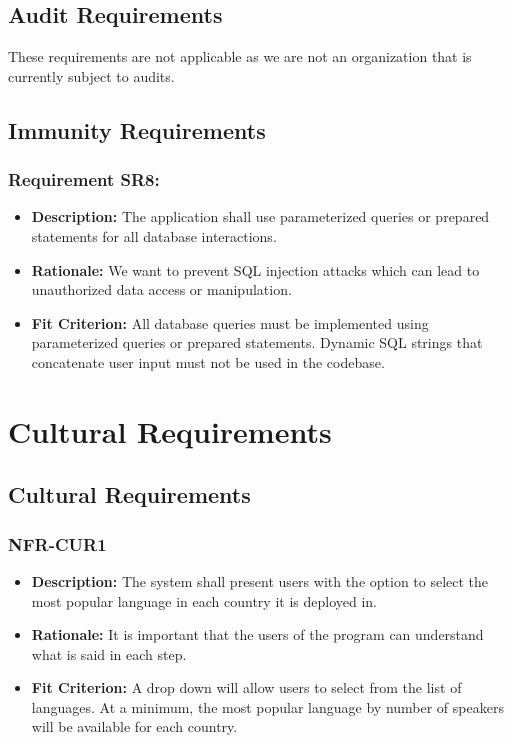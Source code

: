 \documentclass[12pt]{article}
\begin{document}
\subsection{Audit Requirements}
These requirements are not applicable as we are not an organization that is currently subject to audits.
\subsection{Immunity Requirements}
\subsubsection*{Requirement SR8:}
\begin{itemize}
  \item \textbf{Description:} The application shall use parameterized queries or prepared statements for all database interactions.
  \item \textbf{Rationale:} We want to prevent SQL injection attacks which can lead to unauthorized data access or manipulation.
  \item \textbf{Fit Criterion:} All database queries must be implemented using parameterized queries or prepared statements. Dynamic SQL strings that concatenate user input must not be used in the codebase.
\end{itemize}

\section{Cultural Requirements}
\subsection{Cultural Requirements}
\subsubsection*{NFR-CUR1}
\begin{itemize}
  \item \textbf{Description:} The system shall present users with the option to select the most popular language in each country it is deployed in.
  \item \textbf{Rationale:} It is important that the users of the program can understand what is said in each step.
  \item \textbf{Fit Criterion:} A drop down will allow users to select from the list of languages. At a minimum, the most popular language by number of speakers will be available for each country.
\end{itemize}
\end{document}
